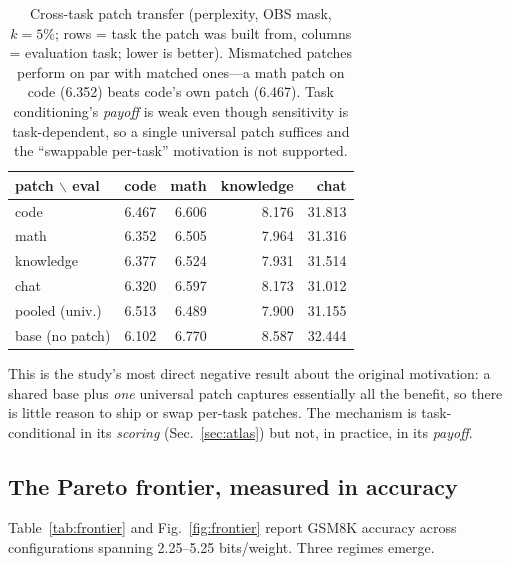 \documentclass[manuscript, screen, review]{jair}
\newcommand{\bpw}{bits/weight}
\begin{document}
\begin{table}[t]
\centering
\caption{Cross-task patch transfer (perplexity, OBS mask, $k{=}5\%$; rows =
task the patch was built from, columns = evaluation task; lower is better).
Mismatched patches perform on par with matched ones---a math patch on code
(6.352) beats code's own patch (6.467). Task conditioning's \emph{payoff} is
weak even though sensitivity is task-dependent, so a single universal patch
suffices and the ``swappable per-task'' motivation is not supported.}
\label{tab:crosstask}
\begin{tabular}{lrrrr}
\toprule
patch $\backslash$ eval & code & math & knowledge & chat \\
\midrule
code            & 6.467 & 6.606 & 8.176 & 31.813 \\
math            & 6.352 & 6.505 & 7.964 & 31.316 \\
knowledge       & 6.377 & 6.524 & 7.931 & 31.514 \\
chat            & 6.320 & 6.597 & 8.173 & 31.012 \\
pooled (univ.)  & 6.513 & 6.489 & 7.900 & 31.155 \\
\midrule
base (no patch) & 6.102 & 6.770 & 8.587 & 32.444 \\
\bottomrule
\end{tabular}
\end{table}

This is the study's most direct negative result about the original motivation:
a shared base plus \emph{one} universal patch captures essentially all the
benefit, so there is little reason to ship or swap per-task patches. The
mechanism is task-conditional in its \emph{scoring} (Sec.~\ref{sec:atlas}) but
not, in practice, in its \emph{payoff}.

\subsection{The Pareto frontier, measured in accuracy}
\label{sec:frontier}
Table~\ref{tab:frontier} and Fig.~\ref{fig:frontier} report GSM8K accuracy
across configurations spanning 2.25--5.25 \bpw{}. Three regimes emerge.
\end{document}
